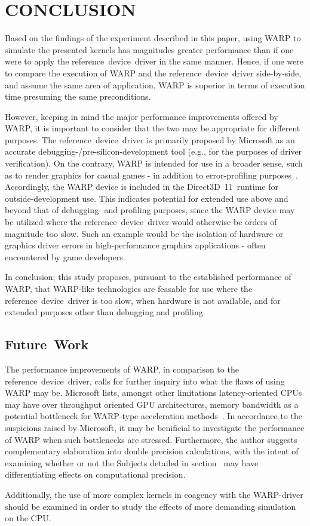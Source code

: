 
\section{CONCLUSION}
\label{sec:conclusion}
Based on the findings of the experiment described in this paper, using WARP to simulate the presented kernels has magnitudes greater performance than if one were to apply the reference~device~driver in the same manner.
Hence, if one were to compare the execution of WARP and the reference~device~driver side-by-side, and assume the same area of application, WARP is superior in terms of execution time presuming the same preconditions.

However, keeping in mind the major performance improvements offered by WARP, it is important to consider that the two may be appropriate for different purposes.
The reference~device~driver is primarily proposed by Microsoft as an accurate debugging-/pre-silicon-development tool (e.g., for the purposes of driver verification).
On the contrary, WARP is intended for use in a broader sense, such as to render graphics for casual games - in addition to error-profiling purposes~.
Accordingly, the WARP device is included in the Direct3D~11~runtime for outside-development use.
This indicates potential for extended use above and beyond that of debugging- and profiling purposes, since the WARP device may be utilized where the reference~device~driver would otherwise be orders of magnitude too slow.
Such an example would be the isolation of hardware or graphics driver errors in high-performance graphics applications - often encountered by game developers.

In conclusion; this study proposes, pursuant to the established performance of WARP, that WARP-like technologies are feasable for use where the reference~device~driver is too slow, when hardware is not available, and for extended purposes other than debugging and profiling.

\subsection{Future~Work}
\label{sec:conclusion:futurework}
The performance improvements of WARP, in comparison to the reference~device~driver, calls for further inquiry into what the flaws of using WARP may be.
Microsoft lists, amongst other limitations latency-oriented CPUs may have over throughput oriented GPU architectures, memory bandwidth as a potential bottleneck for WARP-type acceleration methods~.
In accordance to the suspicions raised by Microsoft, it may be benificial to investigate the performance of WARP when such bottlenecks are stressed.
Furthermore, the author suggests complementary elaboration into double precision calculations, with the intent of examining whether or not the Subjects detailed in section~ may have differentiating effects on computational precision.

Additionally, the use of more complex kernels in coagency with the WARP-driver should be examined in order to study the effects of more demanding simulation on the CPU.
